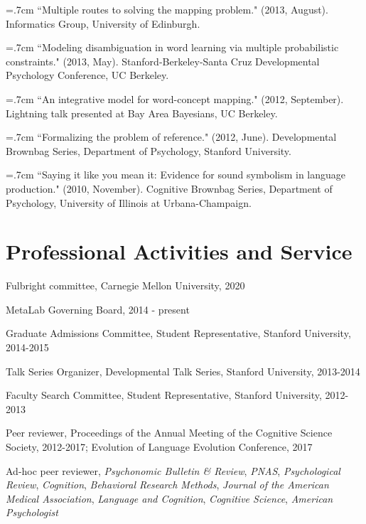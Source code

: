 \documentclass[letterpaper]{article}
\renewenvironment{itemize}{
  \begin{list}{}{
    \setlength{\leftmargin}{1.5em}
  }
}{
  \end{list}
}
\begin{document}
\hangindent=.7cm ``Multiple routes to solving the mapping problem." (2013, August). Informatics Group, University of Edinburgh.

\hangindent=.7cm ``Modeling disambiguation in word learning via multiple probabilistic constraints." (2013, May). Stanford-Berkeley-Santa Cruz Developmental Psychology Conference, UC Berkeley.

 \hangindent=.7cm ``An integrative model for word-concept mapping." (2012, September). Lightning talk presented at Bay Area Bayesians, UC Berkeley.

\hangindent=.7cm ``Formalizing the problem of reference."  (2012, June). Developmental Brownbag Series, Department of Psychology, Stanford University.

\hangindent=.7cm ``Saying it like you mean it: Evidence for sound symbolism in language production." (2010, November). Cognitive Brownbag Series, Department of Psychology, University of Illinois at Urbana-Champaign.

 \singlespacing


\section*{Professional Activities and Service}
\begin{itemize}
\item Fulbright committee, Carnegie Mellon University, 2020
\item MetaLab Governing Board, 2014 - present
\item Graduate Admissions Committee, Student Representative, Stanford University, 2014-2015
\item  Talk Series Organizer, Developmental Talk Series, Stanford University, 2013-2014
\item Faculty Search Committee,  Student Representative,  Stanford University, 2012-2013
\item Peer reviewer, Proceedings of the Annual Meeting of the Cognitive Science Society, 2012-2017; Evolution of Language Evolution Conference, 2017
\item Ad-hoc peer reviewer, {\it Psychonomic Bulletin \& Review},  {\it PNAS},  {\it Psychological Review},  {\it Cognition},  {\it Behavioral Research Methods},  {\it Journal of the American Medical Association},  {\it Language and Cognition},   {\it Cognitive Science},   {\it American Psychologist}
\end{itemize}
\end{document}
